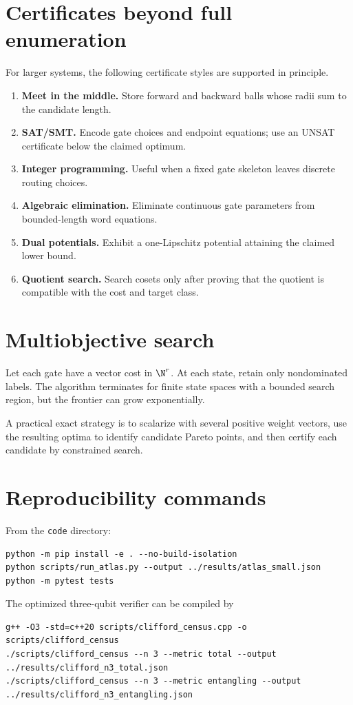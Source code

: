 \section{Certificates beyond full enumeration}
For larger systems, the following certificate styles are supported in principle.
\begin{enumerate}
\item \textbf{Meet in the middle.}  Store forward and backward balls whose radii sum to the candidate length.
\item \textbf{SAT/SMT.}  Encode gate choices and endpoint equations; use an UNSAT certificate below the claimed optimum.
\item \textbf{Integer programming.}  Useful when a fixed gate skeleton leaves discrete routing choices.
\item \textbf{Algebraic elimination.}  Eliminate continuous gate parameters from bounded-length word equations.
\item \textbf{Dual potentials.}  Exhibit a one-Lipschitz potential attaining the claimed lower bound.
\item \textbf{Quotient search.}  Search cosets only after proving that the quotient is compatible with the cost and target class.
\end{enumerate}

\section{Multiobjective search}
Let each gate have a vector cost in $\N^r$.  At each state, retain only nondominated labels.  The algorithm terminates for finite state spaces with a bounded search region, but the frontier can grow exponentially.

A practical exact strategy is to scalarize with several positive weight vectors, use the resulting optima to identify candidate Pareto points, and then certify each candidate by constrained search.

\section{Reproducibility commands}
From the \texttt{code} directory:
\begin{lstlisting}[style=pythonstyle,caption={Python atlas commands.}]
python -m pip install -e . --no-build-isolation
python scripts/run_atlas.py --output ../results/atlas_small.json
python -m pytest tests
\end{lstlisting}
The optimized three-qubit verifier can be compiled by
\begin{lstlisting}[style=cppstyle,caption={C++ Clifford verifier.}]
g++ -O3 -std=c++20 scripts/clifford_census.cpp -o scripts/clifford_census
./scripts/clifford_census --n 3 --metric total --output ../results/clifford_n3_total.json
./scripts/clifford_census --n 3 --metric entangling --output ../results/clifford_n3_entangling.json
\end{lstlisting}

